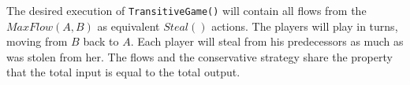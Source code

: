 \begin{proofsketch}
  The desired execution of \texttt{TransitiveGame()} will contain all flows from the $MaxFlow\left(A, B\right)$ as
  equivalent $Steal\left(\right)$ actions. The players will play in turns, moving from $B$ back to $A$. Each player will
  steal from his predecessors as much as was stolen from her. The flows and the conservative strategy share the property
  that the total input is equal to the total output.
\end{proofsketch}

